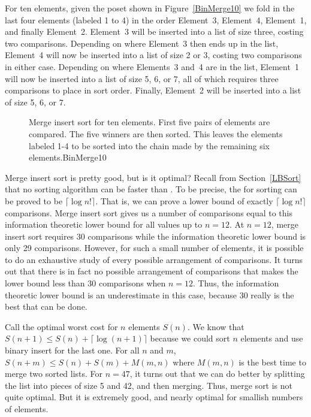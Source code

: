 For ten elements, given the poset shown in Figure~\ref{BinMerge10} we
fold in the last four elements (labeled 1 to 4) in the order Element~3,
Element~4, Element~1, and finally Element~2.
Element~3 will be inserted into a list of size three, costing two
comparisons.
Depending on where Element~3 then ends up in the list, Element~4 will
now be inserted into a list of size 2 or 3, costing two comparisons in
either case.
Depending on where Elements~3 and~4 are in the list, Element~1 will
now be inserted into a list of size 5, 6, or 7, all of which requires
three comparisons to place in sort order.
Finally, Element~2 will be inserted into a list of size 5, 6, or 7.

\begin{figure}

{Merge insert sort for ten elements.
First five pairs of elements are compared.
The five winners are then sorted.
This leaves the elements labeled 1-4 to be sorted into the chain made
by the remaining six elements.}{BinMerge10}
\bigskip
\end{figure}

Merge insert sort is pretty good, but is it optimal?
Recall from Section~\ref{LBSort} that no sorting algorithm can be
faster than \Omeganlogn.
To be precise, the  for
sorting can be proved to be \(\lceil \log n!\rceil\).
That is, we can prove a lower bound of exactly 
\(\lceil \log n!\rceil\) comparisons.
Merge insert sort gives us a number of comparisons equal to this
information theoretic lower bound for all values up to \(n = 12\).
At \(n = 12\), merge insert sort requires 30 comparisons while the
information theoretic lower bound is only 29 comparisons.
However, for such a small number of elements, it is possible to do an
exhaustive study of every possible arrangement of comparisons.
It turns out that there is in fact no possible arrangement of
comparisons that makes the lower bound less than 30 comparisons when
\(n=12\).
Thus, the information theoretic lower bound is an underestimate in this
case, because 30 really is the best that can be done.

Call the optimal worst cost for \(n\) elements \(S(n)\).
We know that \(S(n+1) \leq S(n) + \lceil \log (n+1)\rceil\)
because we could sort \(n\) elements and use binary insert for the
last one.
For all \(n\) and \(m\), \(S(n+m) \leq S(n) + S(m) + M(m, n)\) where
\(M(m, n)\) is the best time to merge two sorted lists.
For \(n = 47\), it turns out that we can do better by splitting the
list into pieces of size 5 and 42, and then merging.
Thus, merge sort is not quite optimal.
But it is extremely good, and nearly optimal for smallish numbers of
elements.

